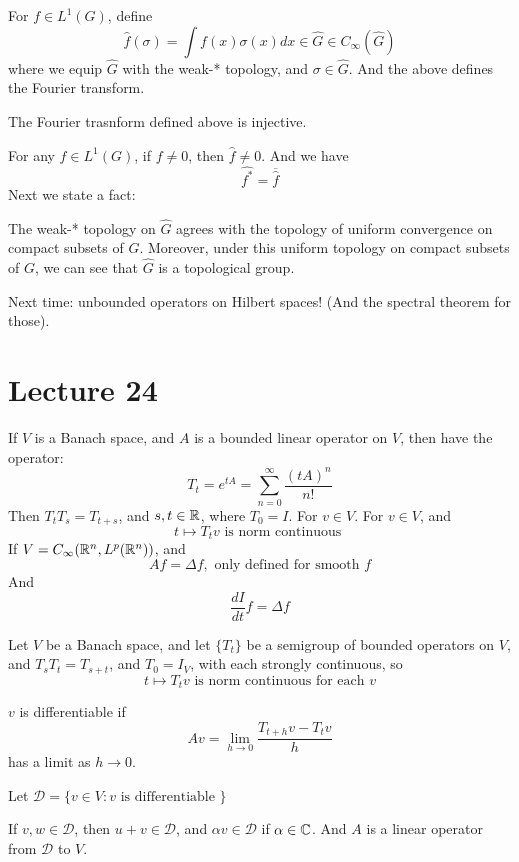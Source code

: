 For $f\in L^1(G)$, define
\begin{equation*}
    \widehat{f}(\sigma)=\int f(x)\sigma(x)dx\in\widehat{G}\in C_\infty(\widehat{G})
\end{equation*}
where we equip $\widehat{G}$ with the weak-* topology, and $\sigma\in\widehat{G}$. And the above defines the Fourier transform.
\begin{corollary}
    The Fourier trasnform defined above is injective.
\end{corollary}
For any $f\in L^1(G)$, if $f\neq 0$, then $\widehat{f}\neq 0$. And we have
\begin{equation*}
    \widehat{f^*}=\overline{\widehat{f}}
\end{equation*}
Next we state a fact: 
\begin{proposition}
    The weak-* topology on $\widehat{G}$ agrees with the topology of uniform convergence on compact subsets of $G$. Moreover, under this uniform topology on compact subsets of $G$, we can see that $\widehat{G}$ is a topological group.
\end{proposition}
Next time: unbounded operators on Hilbert spaces! (And the spectral theorem for those).

\section{Lecture 24}
If $V$ is a Banach space, and $A$ is a bounded linear operator on $V$, then have the operator:
\begin{equation*}
    T_t=e^{tA}=\sum_{n=0}^\infty\frac{(tA)^n}{n!}
\end{equation*}
Then $T_tT_s=T_{t+s}$, and $s,t\in\mathbb{R}$, where $T_0=I$. For $v\in V$. For $v\in V$, and
\begin{equation*}
    t\mapsto T_tv \text{ is norm continuous }
\end{equation*}
If $V=C_\infty(\mathbb{R}^n, L^p(\mathbb{R}^n))$, and
\begin{equation*}
    Af=\Delta f, \text{ only defined for smooth } f
\end{equation*}
And
\begin{equation*}
    \frac{dI}{dt}f=\Delta f 
\end{equation*}

Let $V$ be a Banach space, and let $\{T_t\}$ be a semigroup of bounded operators on $V$, and $T_sT_t=T_{s+t}$, and $T_0=I_V$, with each strongly continuous, so
\begin{equation*}
    t\mapsto T_tv \text{ is norm continuous for each }v
\end{equation*}
\begin{definition}
    $v$ is differentiable if 
    \begin{equation*}
        Av=\lim_{h\to 0}\frac{T_{t+h}v-T_tv}{h}
    \end{equation*}
    has a limit as $h\to 0$.
\end{definition}
Let $\mathcal{D}=\{v\in V: v \text{ is differentiable }\}$ 
\begin{definition}
    If $v, w\in\mathcal{D}$, then $u+v\in\mathcal{D}$, and $\alpha v\in\mathcal{D}$ if $\alpha\in\mathbb{C}$. And $A$ is a linear operator from $\mathcal{D}$ to $V$.
\end{definition}

